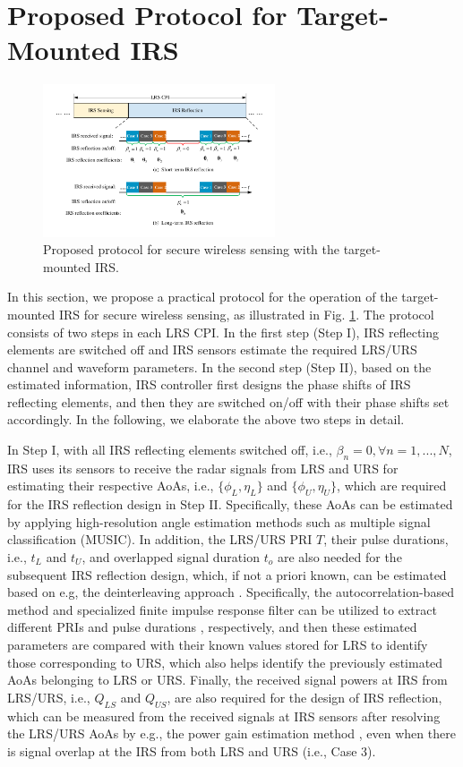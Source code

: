 \documentclass[10pt,final,doublecolumn]{IEEEtran}
\begin{document}
\section{Proposed Protocol for Target-Mounted IRS}
\begin{figure}[t!]
\setlength{\abovecaptionskip}{-0.cm}
\setlength{\belowcaptionskip}{0.cm}
  \centering
\includegraphics [width=0.61\textwidth]{protocol.pdf}
\caption{Proposed protocol for secure wireless sensing with the target-mounted IRS.}
\label{waveformf}
\end{figure}
In this section, we propose a practical protocol for the operation of the target-mounted IRS for secure wireless sensing, as illustrated in Fig. \ref{waveformf}. The protocol consists of two steps in each LRS CPI.
In the first step (Step I), IRS reflecting elements are switched off and IRS sensors estimate the required LRS/URS channel and waveform parameters. In the second step (Step II), based on the estimated information, IRS controller first designs the phase shifts of IRS reflecting elements, and then they are switched on/off with their phase shifts set accordingly. In the following, we elaborate the above two steps in detail.

In Step I, with all IRS reflecting elements switched off, i.e., $\beta_n=0, \forall n=1,...,N$, IRS uses its sensors to receive the radar signals from LRS and URS for estimating their respective AoAs, i.e., $\{\phi_L,\eta_L\}$ and $\{\phi_U,\eta_U\}$, which are required for the IRS reflection design in Step II. Specifically, these AoAs can be estimated by applying high-resolution angle estimation methods such as multiple signal classification (MUSIC)\cite{music}. In addition, the LRS/URS PRI $T$, their pulse durations, i.e., $t_{L}$ and $t_{U}$, and overlapped signal duration $t_o$ are also needed for the subsequent IRS reflection design, which, if not a priori known, can be estimated based on e.g, the deinterleaving approach \cite{dein,ide}. Specifically, the autocorrelation-based method and specialized finite impulse response filter can be utilized to extract different PRIs \cite{dein} and pulse durations \cite{filter, survey}, respectively, and then these estimated parameters are compared with their known values stored for LRS to identify those corresponding to URS, which also helps identify the previously estimated AoAs belonging to LRS or URS. Finally, the received signal powers at IRS from LRS/URS, i.e., $Q_{LS}$ and $Q_{US}$, are also required for the design of IRS reflection, which can be measured from the received signals at IRS sensors after resolving the
LRS/URS AoAs by e.g., the power gain estimation method \cite{mea}, even when there is signal overlap at the IRS from both LRS and URS (i.e., Case 3)\cite{com}.
\end{document}

